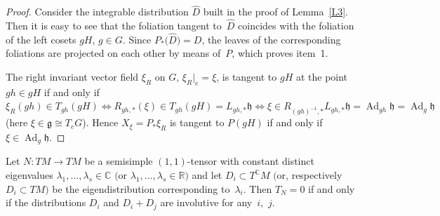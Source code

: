 \begin{proof} Consider the integrable distribution $\widehat D$ built in the proof of Lemma~\ref{L3}. Then it is easy to see that the foliation tangent to~$\widehat D$ coincides with the foliation of the left cosets $gH$, $g\in G$. Since $P_*\big(\widehat D\big)=D$, the leaves of the corresponding foliations are projected on each other by means of~$P$, which proves item~1.

The right invariant vector field $\xi_R $ on $G$, $\xi_R|_e=\xi$, is
 tangent to $gH$ at the point $gh\in gH$ if and only if
$\xi_R ( gh ) \in T_{gh} ( gH) \Leftrightarrow R_{gh,*}(\xi) \in T_{gh} (gH) = L_{gh,*} \mathfrak{h} \Leftrightarrow \xi \in R_{(gh)^{-1},*} L_{gh,*} \mathfrak{h} = \operatorname{Ad}_{gh} \mathfrak {h}=\operatorname{Ad}_g\mathfrak{h} $ (here $\xi\in\mathfrak{g}\cong T_eG$). Hence $X_\xi=P_*\xi_R$ is tangent to $P(gH)$ if and only if $\xi \in \operatorname{Ad}_g \mathfrak{h}$.
\end{proof}

\begin{Lemma}\label{L4} Let $N\colon TM\to TM$ be a semisimple $(1,1)$-tensor with constant distinct eigenvalues $\lambda_1,\dots,\lambda_s \in\mathbb{C}$ $($or $\lambda_1,\dots,\lambda_s \in\mathbb{R})$ and let $D_i \subset T^\mathbb{C} M$ $($or, respectively $D_i \subset T M)$ be the eigendistribution corresponding to~$\lambda_i$. Then $T_N=0$ if and only if the distributions $D_i$ and $D_i+D_j$ are involutive for any~$i$,~$j$.
\end{Lemma}

